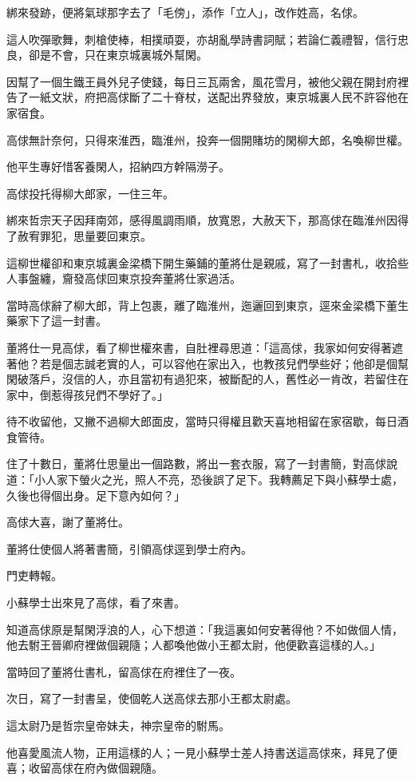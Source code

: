 \documentclass[11pt,a4paper]{article}
\begin{document}
綁來發跡，便將氣球那字去了「毛傍」，添作「立人」，改作姓高，名俅。

這人吹彈歌舞，刺槍使棒，相撲頑耍，亦胡亂學詩書詞賦；若論仁義禮智，信行忠良，卻是不會，只在東京城裏城外幫閑。

因幫了一個生鐵王員外兒子使錢，每日三瓦兩舍，風花雪月，被他父親在開封府裡告了一紙文狀，府把高俅斷了二十脊杖，送配出界發放，東京城裏人民不許容他在家宿食。

高俅無計奈何，只得來淮西，臨淮州，投奔一個開賭坊的閑柳大郎，名喚柳世權。

他平生專好惜客養閑人，招納四方幹隔澇子。

高俅投托得柳大郎家，一住三年。

綁來哲宗天子因拜南郊，感得風調雨順，放寬恩，大赦天下，那高俅在臨淮州因得了赦宥罪犯，思量要回東京。

這柳世權卻和東京城裏金梁橋下開生藥鋪的董將仕是親戚，寫了一封書札，收拾些人事盤纏，齎發高俅回東京投奔董將仕家過活。

當時高俅辭了柳大郎，背上包裹，離了臨淮州，迤邐回到東京，逕來金梁橋下董生藥家下了這一封書。

董將仕一見高俅，看了柳世權來書，自肚裡尋思道：「這高俅，我家如何安得著遮著他？若是個志誠老實的人，可以容他在家出入，也教孩兒們學些好；他卻是個幫閑破落戶，沒信的人，亦且當初有過犯來，被斷配的人，舊性必一肯改，若留住在家中，倒惹得孩兒們不學好了。」

待不收留他，又撇不過柳大郎面皮，當時只得權且歡天喜地相留在家宿歇，每日酒食管待。

住了十數日，董將仕思量出一個路數，將出一套衣服，寫了一封書簡，對高俅說道：「小人家下螢火之光，照人不亮，恐後誤了足下。我轉薦足下與小蘇學士處，久後也得個出身。足下意內如何？」

高俅大喜，謝了董將仕。

董將仕使個人將著書簡，引領高俅逕到學士府內。

門吏轉報。

小蘇學士出來見了高俅，看了來書。

知道高俅原是幫閑浮浪的人，心下想道：「我這裏如何安著得他？不如做個人情，他去駙王晉卿府裡做個親隨；人都喚他做小王都太尉，他便歡喜這樣的人。」

當時回了董將仕書札，留高俅在府裡住了一夜。

次日，寫了一封書呈，使個乾人送高俅去那小王都太尉處。

這太尉乃是哲宗皇帝妹夫，神宗皇帝的駙馬。

他喜愛風流人物，正用這樣的人；一見小蘇學士差人持書送這高俅來，拜見了便喜；收留高俅在府內做個親隨。
\end{document}

